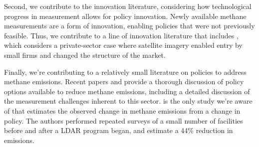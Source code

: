 \documentclass[12pt,oneside,letterpaper]{article}
\theoremstyle{definition}
\begin{document}
\begin{refsection}
Second, we contribute to the innovation literature, considering how technological progress in measurement allows for policy innovation.
Newly available methane measurements are a form of innovation, enabling policies that were not previously feasible.
Thus, we contribute to a line of innovation literature that includes \textcite{Nagaraj:2020}, which considers a private-sector case where satellite imagery enabled entry by small firms and changed the structure of the market.

Finally, we're contributing to a relatively small literature on policies to address methane emissions.
Recent papers
\textcite{Mohlin/Lackner/Nguyen/Wolfe:2022} and
\textcite{Dobson/Goodday/Winter:2023}
provide a thorough discussion of policy options available to reduce methane emissions, including a detailed discussion of the measurement challenges inherent to this sector.
\textcite{Ravikumar/etal:2020} is the only study we're aware of that estimates the observed change in methane emissions from a change in policy.
The authors performed repeated surveys of a small number of facilities before and after a \gls{LDAR} program began, and estimate a 44\% reduction in emissions.


\end{refsection}
\end{document}
